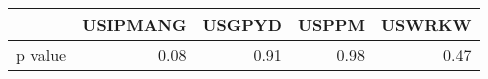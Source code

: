 \begin{tabular}{l|rrrr}

{} & USIPMANG & USGPYD & USPPM & USWRKW \\ \hline\hline

p value &     0.08 &   0.91 &  0.98 &   0.47 \\ \hline\hline

\end{tabular}
